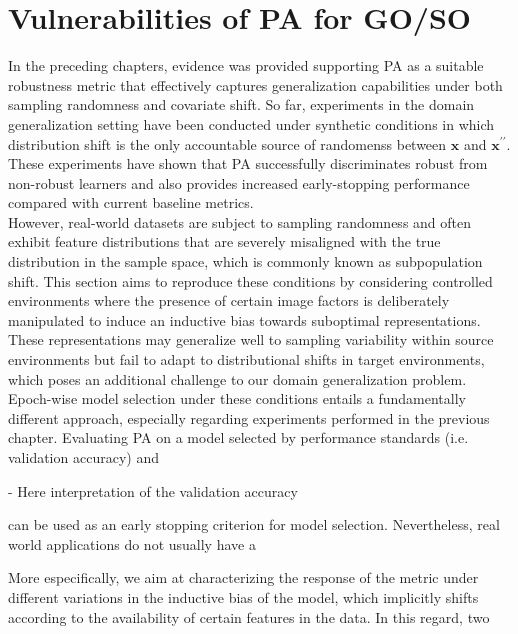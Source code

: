\section{Vulnerabilities of PA for GO/SO}

In the preceding chapters, evidence was provided supporting PA as a suitable robustness metric 
that effectively captures generalization capabilities under both sampling randomness and 
covariate shift. So far, experiments in the domain generalization setting have been conducted 
under synthetic conditions in which distribution shift is the only accountable source of randomenss 
between  $\bm{x}$ and $\bm{x}^{\prime \prime}$. These experiments have shown that PA successfully 
discriminates robust from non-robust learners and also provides increased early-stopping performance compared with
current baseline metrics. \\

However, real-world datasets are subject to sampling randomness and often exhibit feature
distributions that are severely misaligned with the true distribution in the sample space, 
which is commonly known as subpopulation shift. This section aims to reproduce these conditions 
by considering controlled environments where the presence of certain image factors is deliberately 
manipulated to induce an inductive bias towards suboptimal representations. These representations 
may generalize well to sampling variability within source environments but fail to adapt to 
distributional shifts in target environments, which poses an additional challenge to
our domain generalization problem. \\

Epoch-wise model selection under these conditions entails a fundamentally different approach,
especially regarding experiments performed in the previous chapter. Evaluating PA on a model
selected by performance standards (i.e. validation accuracy) and 

- Here interpretation of the validation accuracy 



can be used as an early stopping criterion
for model selection. Nevertheless, real world applications do not usually have a 



More especifically,
we aim at characterizing the response of the metric under different variations in the inductive
bias of the model, which implicitly shifts according to the availability of certain features
in the data. In this regard, two 

